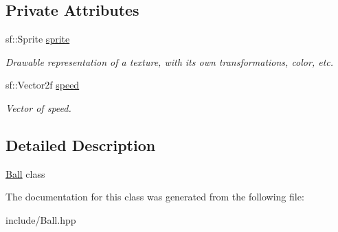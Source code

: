 \subsection*{Private Attributes}
\begin{DoxyCompactItemize}
\item 
\mbox{\label{class_ball_a16017a7b3ea4c4005046eedecb3fe774}} 
sf\+::\+Sprite \mbox{\hyperlink{class_ball_a16017a7b3ea4c4005046eedecb3fe774}{sprite}}
\begin{DoxyCompactList}\small\item\em Drawable representation of a texture, with its own transformations, color, etc. \end{DoxyCompactList}\item 
\mbox{\label{class_ball_a827972a1eab3ea7f878b7c86201a674d}} 
sf\+::\+Vector2f \mbox{\hyperlink{class_ball_a827972a1eab3ea7f878b7c86201a674d}{speed}}
\begin{DoxyCompactList}\small\item\em Vector of speed. \end{DoxyCompactList}\end{DoxyCompactItemize}


\subsection{Detailed Description}
\mbox{\hyperlink{class_ball}{Ball}} class 

The documentation for this class was generated from the following file\+:\begin{DoxyCompactItemize}
\item 
include/Ball.\+hpp\end{DoxyCompactItemize}
